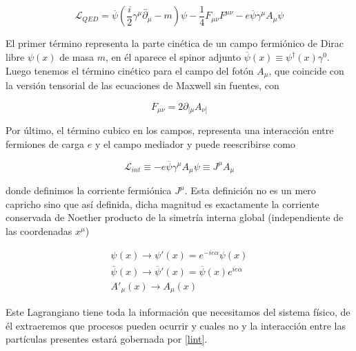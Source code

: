 \documentclass{article}
\numberwithin{equation}{section}
\begin{document}
\begin{equation}\label{lqed}
\mathscr{L}_{QED}=\overline{\psi}\left(\frac{i}{2}\gamma^{\mu}
\overleftrightarrow{\partial_{\mu}}-m\right)\psi-\frac{1}{4}F_{\mu\nu}F^{\mu\nu}-e\overline{\psi}\gamma^{\mu}A_{\mu}\psi
\end{equation}

El primer término representa la parte cinética de un campo fermiónico de Dirac libre $ \psi(x) $ de masa $ m $, en él aparece el spinor adjunto $ \overline{\psi}(x)\equiv\psi^{\dagger}(x) \gamma^0 $. Luego tenemos el término cinético para el campo del fotón $ A_{\mu} $, que coincide con la versión tensorial de las ecuaciones de Maxwell sin fuentes, con

\begin{equation*}
F_{\mu\nu} = 2 \partial_{[\mu}A_{\nu]}
\end{equation*}


Por último, el término cubico en los campos, representa
una interacción entre fermiones de carga $ e $ y el campo mediador y puede reescribirse como

\begin{equation}\label{lint}
\mathscr{L}_{int}\equiv-e\overline{\psi}\gamma^{\mu}A_{\mu}\psi\equiv J^{\mu}A_{\mu}
\end{equation}

donde definimos la corriente fermiónica $J^{\mu}$. Esta definición no es un mero capricho sino que así definida, dicha magnitud es exactamente la corriente conservada de Noether producto de la simetría interna global (independiente de las coordenadas $ x^{\mu} $)

\begin{equation*}
\begin{aligned}
\psi(x) \longrightarrow \psi'(x)=e^{-ie\alpha}\psi(x)\\
\bar{\psi}(x) \longrightarrow \overline{\psi}'(x)=\overline{\psi}(x)e^{ie\alpha}\\
A'_{\mu}(x) \longrightarrow A_{\mu}(x) 
\end{aligned}
\end{equation*}

Este Lagrangiano tiene toda la información que necesitamos
del sistema físico, de él extraeremos que procesos pueden
ocurrir y cuales no y la interacción entre las partículas presentes estará gobernada por \ref{lint}.\\
\end{document}
